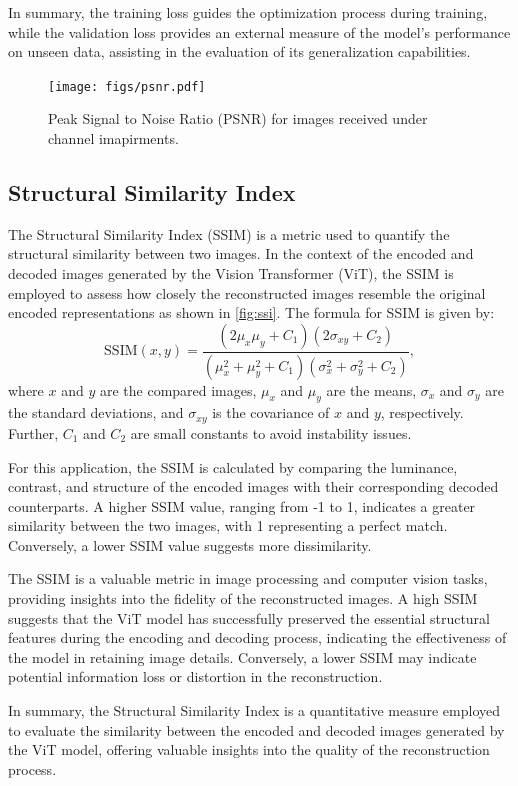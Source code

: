 \documentclass[10pt,twocolumn]{IEEEtran}
\begin{document}
In summary, the training loss guides the optimization process during training, while the validation loss provides an external measure of the model's performance on unseen data, assisting in the evaluation of its generalization capabilities.
\begin{figure}[t!]
    \centering
    \texttt{[image: figs/psnr.pdf]}
    \caption{Peak Signal to Noise Ratio (PSNR) for images received under channel imapirments.}
    \label{fig:psnr}
\end{figure}

\subsection{Structural Similarity Index}
The Structural Similarity Index (SSIM) is a metric used to quantify the structural similarity between two images. In the context of the encoded and decoded images generated by the Vision Transformer (ViT), the SSIM is employed to assess how closely the reconstructed images resemble the original encoded representations as shown in \ref{fig:ssi}.
The formula for SSIM is given by:
\[
    \text{SSIM}(x, y) = \frac{(2\mu_x\mu_y + C_1)(2\sigma_{xy} + C_2)}{(\mu_x^2 + \mu_y^2 + C_1)(\sigma_x^2 + \sigma_y^2 + C_2)},
\]
where \(x\) and \(y\) are the compared images, \(\mu_x\) and \(\mu_y\) are the means, \(\sigma_x\) and \(\sigma_y\) are the standard deviations, and \(\sigma_{xy}\) is the covariance of \(x\) and \(y\), respectively. Further, \(C_1\) and \(C_2\) are small constants to avoid instability issues.

For this application, the SSIM is calculated by comparing the luminance, contrast, and structure of the encoded images with their corresponding decoded counterparts. A higher SSIM value, ranging from -1 to 1, indicates a greater similarity between the two images, with 1 representing a perfect match. Conversely, a lower SSIM value suggests more dissimilarity.

The SSIM is a valuable metric in image processing and computer vision tasks, providing insights into the fidelity of the reconstructed images. A high SSIM suggests that the ViT model has successfully preserved the essential structural features during the encoding and decoding process, indicating the effectiveness of the model in retaining image details. Conversely, a lower SSIM may indicate potential information loss or distortion in the reconstruction.

In summary, the Structural Similarity Index is a quantitative measure employed to evaluate the similarity between the encoded and decoded images generated by the ViT model, offering valuable insights into the quality of the reconstruction process.
\end{document}
